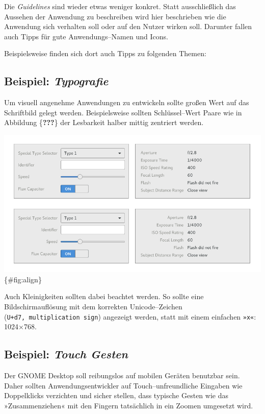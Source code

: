 \documentclass[11pt,ngerman,toc=listof,index=totoc]{scrreprt}
\begin{document}
Die \emph{Guidelines} sind wieder etwas weniger konkret. Statt
ausschließlich das Aussehen der Anwendung zu beschreiben wird hier
beschrieben wie die Anwendung sich verhalten soll oder auf den Nutzer
wirken soll. Darunter fallen auch Tipps für gute Anwendungs--Namen und
Icons.

Beispielsweise finden sich dort auch Tipps zu folgenden Themen:

\subsection{\texorpdfstring{Beispiel:
\emph{Typografie}}{Beispiel: Typografie}}\label{beispiel-typografie}

Um visuell angenehme Anwendungen zu entwickeln sollte großen Wert auf
das Schriftbild gelegt werden. Beispielsweise sollten Schlüssel--Wert
Paare wie in Abbildung \{\textbf{???}\} der Lesbarkeit halber mittig
zentriert werden.

\includegraphics{docs/pics/align.png} \{\#fig:align\}

Auch Kleinigkeiten sollten dabei beachtet werden. So sollte eine
Bildschirmauflösung mit dem korrekten Unicode--Zeichen
(\texttt{U+d7,\ multiplication\ sign}) angezeigt werden, statt mit einem
einfachen \texttt{»x«}: 1024×768.

\subsection{\texorpdfstring{Beispiel: \emph{Touch
Gesten}}{Beispiel: Touch Gesten}}\label{beispiel-touch-gesten}

Der GNOME Desktop soll reibungslos auf mobilen Geräten benutzbar sein.
Daher sollten Anwendungsentwickler auf Touch--unfreundliche Eingaben wie
Doppelklicks verzichten und sicher stellen, dass typische Gesten wie das
»Zusammenziehen« mit den Fingern tatsächlich in ein Zoomen umgesetzt
wird.
\end{document}
